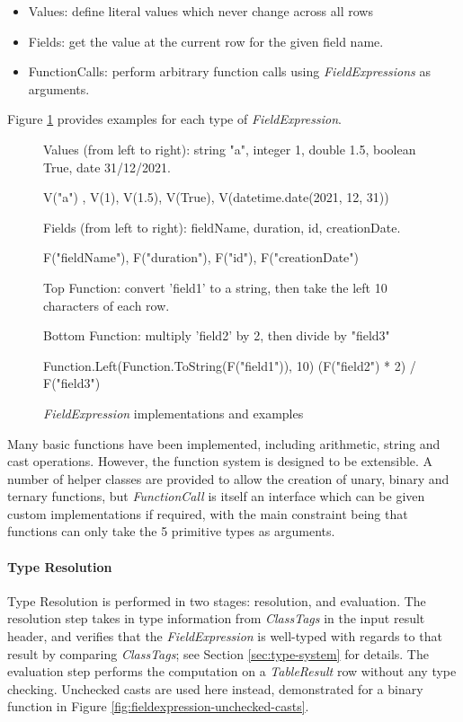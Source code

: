\begin{itemize}
	\item Values: define literal values which never change across all rows
	\item Fields: get the value at the current row for the given field name.
	\item FunctionCalls: perform arbitrary function calls using \textit{FieldExpressions} as arguments.
\end{itemize}

Figure \ref{fig:field-expressions-examples} provides examples for each type of \textit{FieldExpression}.

\begin{figure}[htp]
	Values (from left to right): string "a", integer 1, double 1.5, boolean True, date 31/12/2021.
	\begin{python}
V("a") , V(1), V(1.5), V(True), V(datetime.date(2021, 12, 31))
	\end{python}

	Fields (from left to right): fieldName, duration, id, creationDate.
	\begin{python}
F("fieldName"), F("duration"), F("id"), F("creationDate")
	\end{python}

	Top Function: convert 'field1' to a string, then take the left 10 characters of each row.
	
	Bottom Function: multiply 'field2' by 2, then divide by "field3"
	\begin{python}
Function.Left(Function.ToString(F("field1")), 10)
(F("field2") * 2) / F("field3")
	\end{python}
	\caption{\textit{FieldExpression} implementations and examples}
	\label{fig:field-expressions-examples}
\end{figure}

Many basic functions have been implemented, including arithmetic, string and cast operations. However, the function system is designed to be extensible. A number of helper classes are provided to allow the creation of unary, binary and ternary functions, but \textit{FunctionCall} is itself an interface which can be given custom implementations if required, with the main constraint being that functions can only take the 5 primitive types as arguments.

\paragraph{Type Resolution} 
Type Resolution is performed in two stages: resolution, and evaluation. The resolution step takes in type information from \textit{ClassTags} in the input result header, and verifies that the \textit{FieldExpression} is well-typed with regards to that result by comparing \textit{ClassTags}; see Section \ref{sec:type-system} for details. The evaluation step performs the computation on a \textit{TableResult} row without any type checking. Unchecked casts are used here instead, demonstrated for a binary function in Figure \ref{fig:fieldexpression-unchecked-casts}. 

